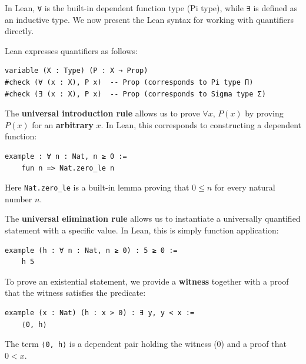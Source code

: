 In Lean, \lstinline[language=lean]|∀| is the built-in dependent
function type (Pi type), while \lstinline[language=lean]|∃| is
defined as an inductive type.
We now present the Lean syntax for working with quantifiers directly.

\begin{example}
  Lean expresses quantifiers as follows:
  \begin{lstlisting}[language=lean]
variable (X : Type) (P : X → Prop)
#check (∀ (x : X), P x)  -- Prop (corresponds to Pi type Π)
#check (∃ (x : X), P x)  -- Prop (corresponds to Sigma type Σ)
  \end{lstlisting}
\end{example}

\begin{example}
  The \textbf{universal introduction rule} allows us to prove
  $\forall x,\, P(x)$ by proving $P(x)$ for an \textbf{arbitrary}
  $x$.
  In Lean, this corresponds to constructing a dependent function:
  \begin{lstlisting}[language=lean]
  example : ∀ n : Nat, n ≥ 0 :=
    fun n => Nat.zero_le n
  \end{lstlisting}
  Here \lstinline[language=lean]|Nat.zero_le| is a built-in lemma
  proving that $0 \le n$ for every natural number $n$.
\end{example}

\begin{example}
  The \textbf{universal elimination rule} allows us to instantiate a
  universally quantified statement with a specific value.
  In Lean, this is simply function application:
  \begin{lstlisting}[language=lean]
  example (h : ∀ n : Nat, n ≥ 0) : 5 ≥ 0 :=
    h 5
  \end{lstlisting}
\end{example}
\newpage
\begin{example}
  To prove an existential statement, we provide a \textbf{witness}
  together with a proof that the witness satisfies the predicate:
  \begin{lstlisting}[language=lean]
  example (x : Nat) (h : x > 0) : ∃ y, y < x :=
    ⟨0, h⟩
  \end{lstlisting}
  The term \lstinline[language=lean]|⟨0, h⟩| is a dependent pair
  holding the witness ($0$) and a proof that $0 < x$.
\end{example}

